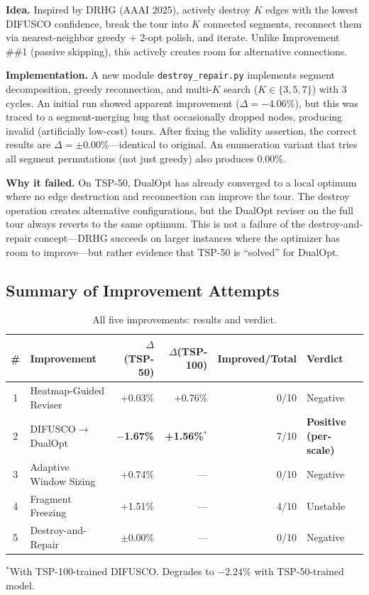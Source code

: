 \documentclass[11pt,a4paper]{article}
\begin{document}
\textbf{Idea.} Inspired by DRHG (AAAI 2025), actively destroy $K$ edges with the lowest DIFUSCO confidence, break the tour into $K$ connected segments, reconnect them via nearest-neighbor greedy + 2-opt polish, and iterate. Unlike Improvement \#\#1 (passive skipping), this actively creates room for alternative connections.

\textbf{Implementation.} A new module \texttt{destroy\_repair.py} implements segment decomposition, greedy reconnection, and multi-$K$ search ($K \in \{3,5,7\}$) with 3 cycles. An initial run showed apparent improvement ($\Delta = -4.06\%$), but this was traced to a segment-merging bug that occasionally dropped nodes, producing invalid (artificially low-cost) tours. After fixing the validity assertion, the correct results are $\Delta = \pm 0.00\%$---identical to original. An enumeration variant that tries all segment permutations (not just greedy) also produces 0.00\%.

\textbf{Why it failed.} On TSP-50, DualOpt has already converged to a local optimum where no edge destruction and reconnection can improve the tour. The destroy operation creates alternative configurations, but the DualOpt reviser on the full tour always reverts to the same optimum. This is not a failure of the destroy-and-repair concept---DRHG succeeds on larger instances where the optimizer has room to improve---but rather evidence that TSP-50 is ``solved'' for DualOpt.

\subsection{Summary of Improvement Attempts}

\begin{table}[H]
\centering
\footnotesize
\caption{All five improvements: results and verdict.}
\label{tab:improvements}
\begin{tabular}{@{}clrrrl@{}}
\toprule
\# & Improvement & $\Delta$(TSP-50) & $\Delta$(TSP-100) & Improved/Total & Verdict \\
\midrule
1 & Heatmap-Guided Reviser & +0.03\% & +0.76\% & 0/10 & Negative \\
2 & DIFUSCO$\rightarrow$DualOpt & \textbf{$-$1.67\%} & \textbf{+1.56\%}$^*$ & 7/10 & \textbf{Positive (per-scale)} \\
3 & Adaptive Window Sizing & +0.74\% & --- & 0/10 & Negative \\
4 & Fragment Freezing & +1.51\% & --- & 4/10 & Unstable \\
5 & Destroy-and-Repair & $\pm$0.00\% & --- & 0/10 & Negative \\
\bottomrule
\end{tabular}

\smallskip
\footnotesize{$^*$With TSP-100-trained DIFUSCO. Degrades to $-2.24\%$ with TSP-50-trained model.}
\end{table}
\end{document}
